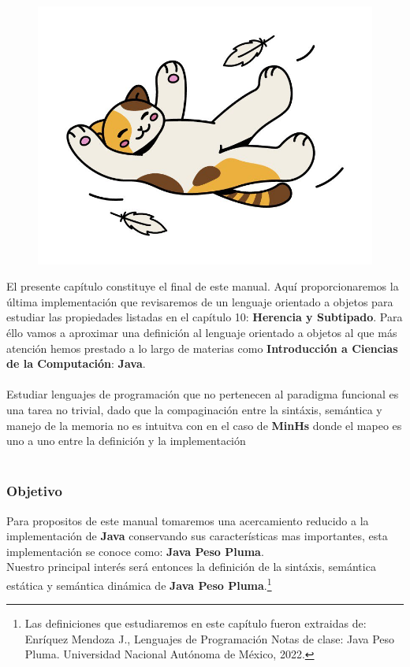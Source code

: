 
\begin{figure}[htbp]
    \centerline{\includegraphics[scale=.4]{assets/11_gatito_cayendo.jpg}}
\end{figure} 
\bigskip

El presente capítulo constituye el final de este manual. Aquí proporcionaremos la última implementación que revisaremos de un lenguaje orientado a objetos para estudiar las propiedades listadas en el capítulo 10: \textbf{Herencia y Subtipado}.
Para éllo vamos a aproximar una definición al lenguaje orientado a objetos al que más atención hemos prestado a lo largo de materias como \textbf{Introducción a Ciencias de la Computación}: \textbf{Java}.\\\\
Estudiar lenguajes de programación que no pertenecen al paradigma funcional es una tarea no trivial, dado que la compaginación entre la sintáxis, semántica y manejo de la memoria no es intuitva con en el caso de \textbf{MinHs} donde el mapeo es uno a uno entre la definición y la implementación\\\\

\subsubsection{Objetivo}
Para propositos de este manual tomaremos una acercamiento reducido a la implementación de \textbf{Java} conservando sus características mas importantes, esta implementación se conoce como: \textbf{Java Peso Pluma}.\\
Nuestro principal interés será entonces la definición de la sintáxis, semántica estática y semántica dinámica de \textbf{Java Peso Pluma}.\footnote{Las definiciones que estudiaremos en este capítulo fueron extraidas de: Enríquez Mendoza J., Lenguajes de Programación Notas de clase: Java Peso Pluma. Universidad Nacional Autónoma de México, 2022.}\\

